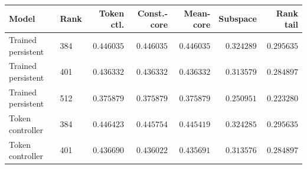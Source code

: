 \begin{tabular}{llrrrrr}
\toprule
Model & Rank & Token ctl. & Const.-core & Mean-core & Subspace & Rank tail \\
\midrule
Trained persistent & 384 & $0.446035$ & $0.446035$ & $0.446035$ & $0.324289$ & $0.295635$ \\
Trained persistent & 401 & $0.436332$ & $0.436332$ & $0.436332$ & $0.313579$ & $0.284897$ \\
Trained persistent & 512 & $0.375879$ & $0.375879$ & $0.375879$ & $0.250951$ & $0.223280$ \\
Token controller & 384 & $0.446423$ & $0.445754$ & $0.445419$ & $0.324285$ & $0.295635$ \\
Token controller & 401 & $0.436690$ & $0.436022$ & $0.435691$ & $0.313576$ & $0.284897$ \\
\bottomrule
\end{tabular}
